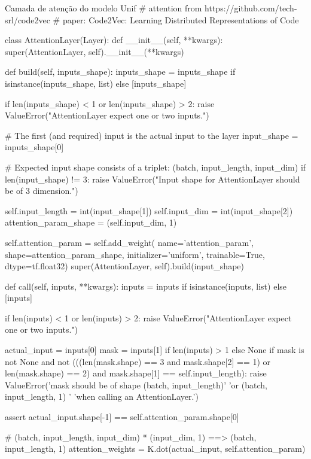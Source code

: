 \begin{mypython-linenumber}{Camada de atenção do modelo Unif}
# attention from https://github.com/tech-srl/code2vec
# paper: Code2Vec: Learning Distributed Representations of Code

class AttentionLayer(Layer):
    def __init__(self, **kwargs):
        super(AttentionLayer, self).__init__(**kwargs)

    def build(self, inputs_shape):
        inputs_shape = inputs_shape if isinstance(inputs_shape, list) else [inputs_shape]

        if len(inputs_shape) < 1 or len(inputs_shape) > 2:
            raise ValueError("AttentionLayer expect one or two inputs.")

        # The first (and required) input is the actual input to the layer
        input_shape = inputs_shape[0]

        # Expected input shape consists of a triplet: (batch, input_length, input_dim)
        if len(input_shape) != 3:
            raise ValueError("Input shape for AttentionLayer should be of 3 dimension.")

        self.input_length = int(input_shape[1])
        self.input_dim = int(input_shape[2])
        attention_param_shape = (self.input_dim, 1)

        self.attention_param = self.add_weight(
            name='attention_param',
            shape=attention_param_shape,
            initializer='uniform',
            trainable=True,
            dtype=tf.float32)
        super(AttentionLayer, self).build(input_shape)

    def call(self, inputs, **kwargs):
        inputs = inputs if isinstance(inputs, list) else [inputs]

        if len(inputs) < 1 or len(inputs) > 2:
            raise ValueError("AttentionLayer expect one or two inputs.")

        actual_input = inputs[0]
        mask = inputs[1] if len(inputs) > 1 else None
        if mask is not None and not (((len(mask.shape) == 3 and mask.shape[2] == 1) or len(mask.shape) == 2)
                                     and mask.shape[1] == self.input_length):
            raise ValueError('mask should be of shape (batch, input_length)'
                             'or (batch, input_length, 1) '
                             'when calling an AttentionLayer.')

        assert actual_input.shape[-1] == self.attention_param.shape[0]

        # (batch, input_length, input_dim) * (input_dim, 1) ==> (batch, input_length, 1)
        attention_weights = K.dot(actual_input, self.attention_param)


\end{mypython-linenumber}
